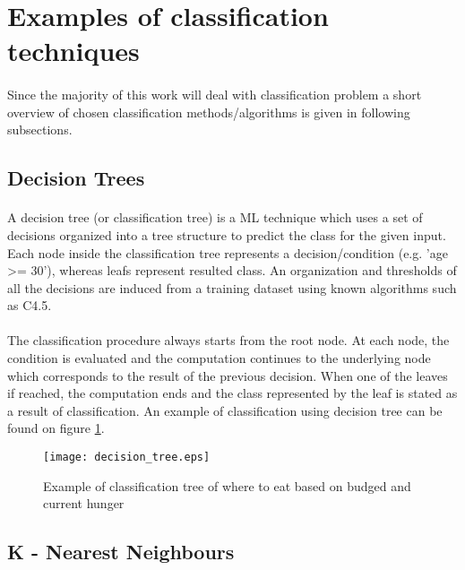 \section{Examples of classification techniques}
\paragraph{}
Since the majority of this work will deal with classification problem a short overview of chosen classification methods/algorithms is given in following subsections.

\subsection{Decision Trees}
\paragraph{}
A decision tree (or classification tree) is a ML technique which uses a set of decisions organized into a tree structure to predict the class for the given input. Each node inside the classification tree represents a decision/condition (e.g. 'age >= 30'), whereas leafs represent resulted class. An organization and thresholds of all the decisions are induced from a training dataset using known algorithms such as C4.5. \cite{decision_trees}

\paragraph{}
The classification procedure always starts from the root node. At each node, the condition is evaluated and the computation continues to the underlying node which corresponds to the result of the previous decision. When one of the leaves if reached, the computation ends and the class represented by the leaf is stated as a result of classification. An example of classification using decision tree can be found on figure \ref{decision_tree_example}.

\begin{figure}[!h]
	\texttt{[image: decision\_tree.eps]}
	\centering
	\caption{Example of classification tree of where to eat based on budged and current hunger}
	\label{decision_tree_example}
\end{figure}

\subsection{K - Nearest Neighbours}
